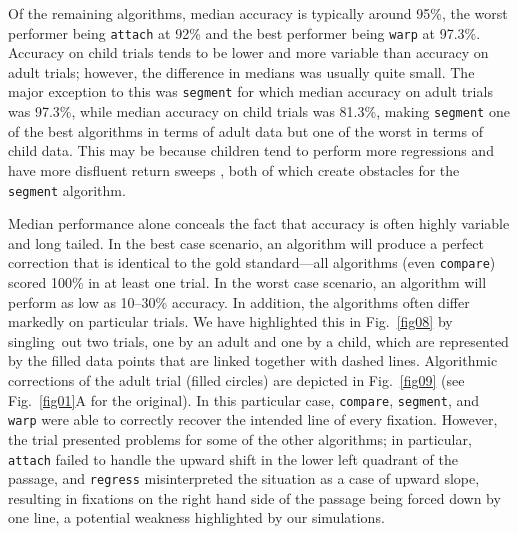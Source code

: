 \documentclass[doc,biblatex]{apa7}
\begin{document}
Of the remaining algorithms, median accuracy is typically around 95\%, the worst performer being \texttt{attach} at 92\% and the best performer being \texttt{warp} at 97.3\%. Accuracy on child trials tends to be lower and more variable than accuracy on adult trials; however, the difference in medians was usually quite small. The major exception to this was \texttt{segment} for which median accuracy on adult trials was 97.3\%, while median accuracy on child trials was 81.3\%, making \texttt{segment} one of the best algorithms in terms of adult data but one of the worst in terms of child data. This may be because children tend to perform more regressions \parencite[e.g.,][]{BlytheJoseph:2011} and have more disfluent return sweeps \parencite[e.g.,][]{Parker:2019}, both of which create obstacles for the \texttt{segment} algorithm.

Median performance alone conceals the fact that accuracy is often highly variable and long tailed. In the best case scenario, an algorithm will produce a perfect correction that is identical to the gold standard---all algorithms (even \texttt{compare}) scored 100\% in at least one trial. In the worst case scenario, an algorithm will perform as low as 10--30\% accuracy. In addition, the algorithms often differ markedly on particular trials. We have highlighted this in Fig.~\ref{fig08} by singling~out two trials, one by an adult and one by a child, which are represented by the filled data points that are linked together with dashed lines. Algorithmic corrections of the adult trial (filled circles) are depicted in Fig.~\ref{fig09} (see Fig.~\ref{fig01}A for the original). In this particular case, \texttt{compare}, \texttt{segment}, and \texttt{warp} were able to correctly recover the intended line of every fixation. However, the trial presented problems for some of the other algorithms; in particular, \texttt{attach} failed to handle the upward shift in the lower left quadrant of the passage, and \texttt{regress} misinterpreted the situation as a case of upward slope, resulting in fixations on the right hand side of the passage being forced down by one line, a potential weakness highlighted by our simulations.
\end{document}
